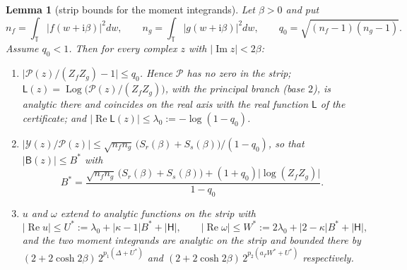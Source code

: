 \documentclass[11pt]{article}
\newtheorem{lemma}{Lemma}[section]
\theoremstyle{definition}
\newcommand{\Tc}{\mathbb T}
\newcommand{\abs}[1]{\lvert #1\rvert}
\begin{document}
\begin{lemma}[strip bounds for the moment integrands]\label{lem:strip}
Let $\beta>0$ and put
\[
 n_f=\int_{\Tc}\abs{f(w+\mathrm i\beta)}^2dw,\qquad n_g=\int_{\Tc}\abs{g(w+\mathrm i\beta)}^2dw,\qquad
 q_0=\sqrt{(n_f-1)(n_g-1)} .
\]
Assume $q_0<1$. Then for every complex $z$ with $\abs{\operatorname{Im}z}<2\beta$:
\begin{enumerate}[label=\textup{(\alph*)}]
\item $\bigl\lvert\mathcal P(z)/(Z_fZ_g)-1\bigr\rvert\le q_0$. Hence $\mathcal P$ has no zero in the strip;
$\mathsf L(z)=\operatorname{Log}\bigl(\mathcal P(z)/(Z_fZ_g)\bigr)$, with the principal branch (base $2$), is
analytic there and coincides on the real axis with the real function $\mathsf L$ of the certificate; and
$\abs{\operatorname{Re}\mathsf L(z)}\le\lambda_0:=-\log(1-q_0)$.
\item $\bigl\lvert\mathcal Y(z)/\mathcal P(z)\bigr\rvert\le\sqrt{n_fn_g}\,\bigl(S_r(\beta)+S_s(\beta)\bigr)/(1-q_0)$, so that
$\abs{\mathsf B(z)}\le B^\ast$ with
\[
 B^\ast=\frac{\sqrt{n_fn_g}\,\bigl(S_r(\beta)+S_s(\beta)\bigr)+(1+q_0)\abs{\log(Z_fZ_g)}}{1-q_0}.
\]
\item $u$ and $\omega$ extend to analytic functions on the strip with
\[
 \abs{\operatorname{Re}u}\le U^\ast:=\lambda_0+\abs{\kappa-1}B^\ast+\abs{\mathsf H},\qquad
 \abs{\operatorname{Re}\omega}\le W^\ast:=2\lambda_0+\abs{2-\kappa}B^\ast+\abs{\mathsf H},
\]
and the two moment integrands are analytic on the strip and bounded there by
$(2+2\cosh2\beta)\,2^{p_1(\Delta+U^\ast)}$ and $(2+2\cosh2\beta)\,2^{p_2(a_\Gamma W^\ast+U^\ast)}$ respectively.
\end{enumerate}
\end{lemma}
\end{document}
